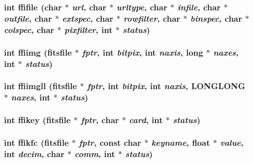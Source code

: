 \subsubsection{\setlength{\rightskip}{0pt plus 5cm}int ffifile (char $\ast$ {\em url}, char $\ast$ {\em urltype}, char $\ast$ {\em infile}, char $\ast$ {\em outfile}, char $\ast$ {\em extspec}, char $\ast$ {\em rowfilter}, char $\ast$ {\em binspec}, char $\ast$ {\em colspec}, char $\ast$ {\em pixfilter}, int $\ast$ {\em status})}\label{src_2fitsio_8h_a145a043753a554e3f743ee431fc65d6}


\subsubsection{\setlength{\rightskip}{0pt plus 5cm}int ffiimg (\bf{fitsfile} $\ast$ {\em fptr}, int {\em bitpix}, int {\em naxis}, long $\ast$ {\em naxes}, int $\ast$ {\em status})}\label{src_2fitsio_8h_bdfe7ce055dc6e2df14de16381703b35}


\subsubsection{\setlength{\rightskip}{0pt plus 5cm}int ffiimgll (\bf{fitsfile} $\ast$ {\em fptr}, int {\em bitpix}, int {\em naxis}, \bf{LONGLONG} $\ast$ {\em naxes}, int $\ast$ {\em status})}\label{src_2fitsio_8h_657626db84e4c427330c2684375832d5}


\subsubsection{\setlength{\rightskip}{0pt plus 5cm}int ffikey (\bf{fitsfile} $\ast$ {\em fptr}, char $\ast$ {\em card}, int $\ast$ {\em status})}\label{src_2fitsio_8h_3fad2ca6c44422526a0994f06d424607}


\subsubsection{\setlength{\rightskip}{0pt plus 5cm}int ffikfc (\bf{fitsfile} $\ast$ {\em fptr}, const char $\ast$ {\em keyname}, float $\ast$ {\em value}, int {\em decim}, char $\ast$ {\em comm}, int $\ast$ {\em status})}\label{src_2fitsio_8h_39166dca79658791f345fcd1af07329d}


